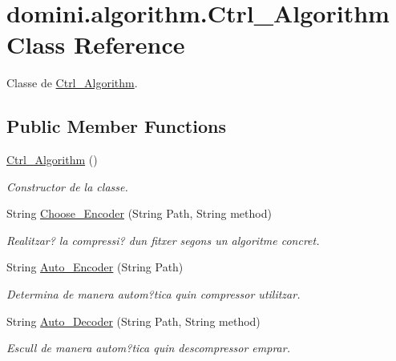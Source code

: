 \hypertarget{classdomini_1_1algorithm_1_1Ctrl__Algorithm}{}\section{domini.\+algorithm.\+Ctrl\+\_\+\+Algorithm Class Reference}
\label{classdomini_1_1algorithm_1_1Ctrl__Algorithm}


Classe de \hyperlink{classdomini_1_1algorithm_1_1Ctrl__Algorithm}{Ctrl\+\_\+\+Algorithm}.  


\subsection*{Public Member Functions}
\begin{DoxyCompactItemize}
\item 
\mbox{\label{classdomini_1_1algorithm_1_1Ctrl__Algorithm_aa625781819b57512a3e42df15a3b2ffb}} 
\hyperlink{classdomini_1_1algorithm_1_1Ctrl__Algorithm_aa625781819b57512a3e42df15a3b2ffb}{Ctrl\+\_\+\+Algorithm} ()
\begin{DoxyCompactList}\small\item\em Constructor de la classe. \end{DoxyCompactList}\item 
String \hyperlink{classdomini_1_1algorithm_1_1Ctrl__Algorithm_a5af3b3afa4465c95093532396cecb8c7}{Choose\+\_\+\+Encoder} (String Path, String method)
\begin{DoxyCompactList}\small\item\em Realitzar? la compressi? d\textquotesingle{}un fitxer segons un algoritme concret. \end{DoxyCompactList}\item 
String \hyperlink{classdomini_1_1algorithm_1_1Ctrl__Algorithm_a6f7a706e07d4e6f8c1ea293d06e17318}{Auto\+\_\+\+Encoder} (String Path)
\begin{DoxyCompactList}\small\item\em Determina de manera autom?tica quin compressor utilitzar. \end{DoxyCompactList}\item 
String \hyperlink{classdomini_1_1algorithm_1_1Ctrl__Algorithm_a613d15cc5326fc688b11d2c71ec9500a}{Auto\+\_\+\+Decoder} (String Path, String method)
\begin{DoxyCompactList}\small\item\em Escull de manera autom?tica quin descompressor emprar. \end{DoxyCompactList}\end{DoxyCompactItemize}


